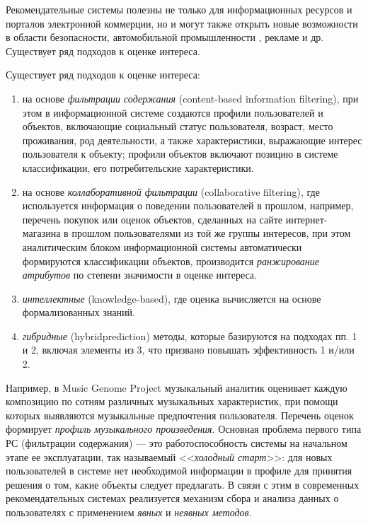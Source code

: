 \documentclass[a4paper,14pt,openany,final]{extreport} %
\begin{document}
Рекомендательные системы полезны не только для информационных ресурсов и порталов электронной коммерции, но и могут также открыть новые возможности в области безопасности, автомобильной промышленности \cite{b3}, рекламе \cite{b4} и др.
Существует ряд подходов к оценке интереса.

Существует ряд подходов к оценке интереса:
\begin{enumerate}
\item на основе \emph{фильтрации содержания}
  (\foreignlanguage{english}{content-based information filtering}), при этом в информационной
  системе создаются профили пользователей и объектов, включающие
  социальный статус пользователя, возраст, место проживания, род
  деятельности, а также характеристики, выражающие интерес
  пользователя к объекту; профили объектов включают позицию в системе
  классификации, его потребительские характеристики. %
\item	на основе\emph{ коллаборативной фильтрации} (\foreignlanguage{english}{collaborative filtering}), где используется информация о поведении пользователей в прошлом, например, перечень покупок или оценок объектов, сделанных на сайте интернет-магазина в прошлом пользователями из той же группы интересов, при этом аналитическим блоком информационной системы автоматически формируются классификации объектов, производится \emph{ранжирование атрибутов} по степени значимости в оценке интереса.
\item	\emph{интеллектные} (knowledge-based), где оценка вычисляется на основе формализованных знаний.
\item	\emph{гибридные} (\foreignlanguage{english}{hybridprediction}) методы, которые базируются на подходах пп. 1 и 2, включая элементы из 3, что призвано повышать эффективность 1 и/или 2.
\end{enumerate}

Например, в Music Genome Project музыкальный аналитик оценивает каждую композицию по сотням различных музыкальных характеристик, при помощи которых выявляются музыкальные предпочтения пользователя. Перечень оценок формирует \emph{профиль музыкального произведения}. Основная проблема первого типа РС (фильтрации содержания) — это работоспособность системы на начальном этапе ее эксплуатации, так называемый <<\emph{холодный старт}>>: для новых пользователей в системе нет необходимой информации в профиле для принятия решения о том, какие объекты следует предлагать. В связи с этим в современных рекомендательных системах реализуется механизм сбора и анализа данных о пользователях с применением \emph{явных} и \emph{неявных методов}.
\end{document}
